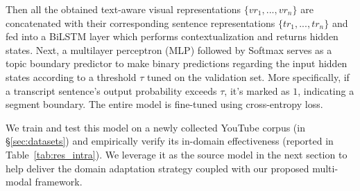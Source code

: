 \documentclass[runningheads]{llncs}
\begin{document}

Then all the obtained text-aware visual representations $\{ vr_1, ..., vr_{n} \}$ are concatenated with their corresponding sentence representations $\{ tr_1, ..., tr_{n} \}$ and fed into a BiLSTM layer which performs contextualization and returns hidden states. Next, a multilayer perceptron (MLP) followed by Softmax serves as a topic boundary predictor to make binary predictions regarding the input hidden states according to a threshold $\tau$ tuned on the validation set. More specifically, if a transcript sentence's output probability exceeds $\tau$, it's marked as $1$, indicating a segment boundary. The entire model is fine-tuned using cross-entropy loss.

We train and test this model on a newly collected YouTube corpus (in \S\ref{sec:datasets}) and empirically verify its in-domain effectiveness (reported in Table~\ref{tab:res_intra}).
We leverage it as the source model in the next section to help deliver the domain adaptation strategy coupled with our proposed multi-modal framework. 
\end{document}
